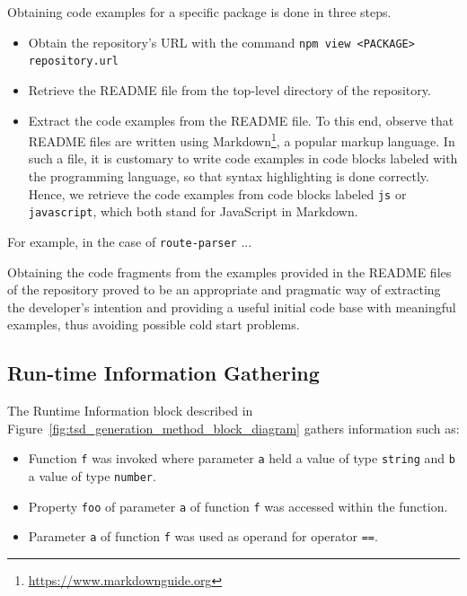 \documentclass[a4paper,english,cleveref, autoref]{lipics-v2019}
\newcommand{\figref}[1]{Figure~\ref{#1}}
\begin{document}
Obtaining code examples for a specific \NPM{} package is done in three steps.
\begin{itemize}
\item Obtain the  repository's URL with the command
  \texttt{npm view <PACKAGE> repository.url}

\item Retrieve the README file from the top-level directory of the repository.

\item Extract the code examples from the README file. To this end,
  observe that README files are
  written using Markdown\footnote{\url{https://www.markdownguide.org}}, a
  popular markup language. In such a file, it is customary to write
  code examples in code blocks labeled with the programming
  language, so that syntax highlighting is done correctly. Hence, we
  retrieve the code examples from code blocks labeled \texttt{js} or
  \texttt{javascript}, which both stand for JavaScript in
  Markdown.
\end{itemize}

For example, in the case of \texttt{route-parser} ...

Obtaining the code fragments from the examples provided in the
README files of the repository proved to be an
appropriate and pragmatic way of extracting the developer's
intention and providing a useful initial code base with meaningful
examples, thus avoiding possible cold start problems.



\subsection{Run-time Information Gathering}
The Runtime Information block described in
\figref{fig:tsd_generation_method_block_diagram} gathers
information such as: 

\begin{itemize}
  \item Function \lstinline{f} was invoked where parameter
    \lstinline{a} held a value of type \lstinline{string} and
    \lstinline{b} a value of type \lstinline{number}. 
  \item Property \lstinline{foo} of parameter \lstinline{a} of
    function \lstinline{f} was accessed within the function. 
  \item Parameter \lstinline{a} of function \lstinline{f} was used as
    operand for operator \lstinline{==}. 
\end{itemize}
\end{document}
